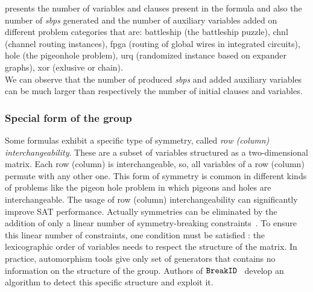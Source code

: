 

 presents the number of variables and clauses present in the formula and also the  
number of \textit{sbps} generated and the number of auxiliary variables added on different problem categories that are:
battleship (the battleship puzzle), chnl (channel routing instances), fpga (routing of global wires in integrated circuits),
 hole (the pigeonhole problem), urq (randomized instance based on expander graphs), xor (exlusive or chain).\\
We can observe that the number of produced \textit{sbps} and added auxiliary variables can be much larger than
respectively the number of initial clauses and variables.

%
\subsubsection{Special form of the group} \label{sec:matrix-sbp}
Some formulas exhibit a specific type of symmetry, called \emph{row (column) interchangeability}. These are
a subset of variables structured as a two-dimensional matrix. Each row (column) is interchangeable,
so, all variables of a row (column) permute with any other one.
This form of symmetry is common in different kinds of problems like the pigeon hole problem in which
pigeons and holes are interchangeable. %
The usage of row (column) interchangeability can significantly improve SAT performance. 
Actually symmetries can be eliminated by the addition 
of only a linear number of symmetry-breaking constraints~\cite{flener2002breaking}. 
To ensure this linear number of constraints, one condition must be satisfied :
the lexicographic order of variables needs to respect the structure of the matrix.
In practice, automorphism tools give only  set of generators that contains no information on
the structure of the group. 
Authors of $\texttt{BreakID}$~\cite{devriendt2016improved} develop an algorithm to detect this specific 
structure and exploit it.

